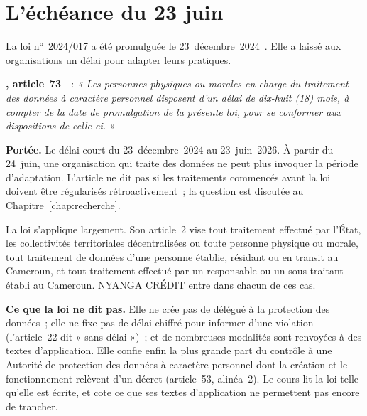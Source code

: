 \section{L'échéance du 23 juin}
\label{sec:p00-echeance}

La loi n°~2024/017 a été promulguée le 23~décembre~2024~\cite{loi2024017}.
Elle a laissé aux organisations un délai pour adapter leurs pratiques.

\begin{boxjuris}
\textbf{, article~73}~\cite{loi2024017}~:
\textit{« Les personnes physiques ou morales en charge du traitement des
données à caractère personnel disposent d'un délai de dix-huit (18) mois, à
compter de la date de promulgation de la présente loi, pour se conformer aux
dispositions de celle-ci. »}

\smallskip
\textbf{Portée.} Le délai court du 23~décembre~2024 au 23~juin~2026. À
partir du 24~juin, une organisation qui traite des données ne peut plus
invoquer la période d'adaptation. L'article ne dit pas si les traitements
commencés avant la loi doivent être régularisés rétroactivement~; la
question est discutée au Chapitre~\ref{chap:recherche}.
\end{boxjuris}

La loi s'applique largement. Son article~2 vise tout traitement effectué
par l'État, les collectivités territoriales décentralisées ou toute
personne physique ou morale, tout traitement de données d'une personne
établie, résidant ou en transit au Cameroun, et tout traitement effectué
par un responsable ou un sous-traitant établi au Cameroun. NYANGA CRÉDIT
entre dans chacun de ces cas.

\begin{boxinfo}
\textbf{Ce que la loi ne dit pas.} Elle ne crée pas de délégué à la
protection des données~; elle ne fixe pas de délai chiffré pour informer
d'une violation (l'article~22 dit « sans délai »)~; et de nombreuses
modalités sont renvoyées à des textes d'application. Elle confie enfin
la plus grande part du contrôle à une Autorité de protection des données à
caractère personnel dont la création et le fonctionnement relèvent d'un
décret (article~53, alinéa~2). Le cours lit la loi telle qu'elle est écrite,
et cote \NEK{} ce que ses textes d'application ne permettent pas encore de
trancher.
\end{boxinfo}

